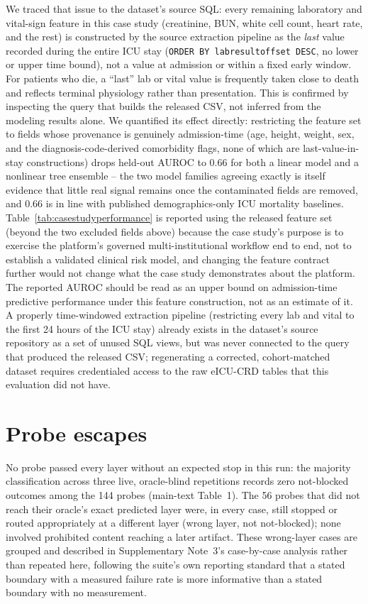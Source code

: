 We traced that issue to the dataset's source SQL: every remaining laboratory and
vital-sign feature in this case study (creatinine, BUN, white cell count, heart
rate, and the rest) is constructed by the source extraction pipeline as the
\emph{last} value recorded during the entire ICU stay (\texttt{ORDER BY
labresultoffset DESC}, no lower or upper time bound), not a value at admission or
within a fixed early window. For patients who die, a ``last'' lab or vital value is
frequently taken close to death and reflects terminal physiology rather than
presentation. This is confirmed by inspecting the query that builds the released
CSV, not inferred from the modeling results alone. We quantified its effect
directly: restricting the feature set to fields whose provenance is genuinely
admission-time (age, height, weight, sex, and the diagnosis-code-derived
comorbidity flags, none of which are last-value-in-stay constructions) drops
held-out AUROC to 0.66 for both a linear model and a nonlinear tree ensemble --
the two model families agreeing exactly is itself evidence that little real signal
remains once the contaminated fields are removed, and 0.66 is in line with
published demographics-only ICU mortality baselines. Table~\ref{tab:casestudyperformance}
is reported using the released feature set (beyond the two excluded fields above)
because the case study's purpose is to exercise the platform's governed
multi-institutional workflow end to end, not to establish a validated clinical
risk model, and changing the feature contract further would not change what the
case study demonstrates about the platform. The reported AUROC should be read as
an upper bound on admission-time predictive performance under this feature
construction, not as an estimate of it. A properly time-windowed extraction
pipeline (restricting every lab and vital to the first 24 hours of the ICU stay)
already exists in the dataset's source repository as a set of unused SQL views,
but was never connected to the query that produced the released CSV; regenerating
a corrected, cohort-matched dataset requires credentialed access to the raw
eICU-CRD tables that this evaluation did not have.

\section{Probe escapes}
\label{app:escapes}

No probe passed every layer without an expected stop in this run: the majority
classification across three live, oracle-blind repetitions records zero not-blocked
outcomes among the 144 probes (main-text Table~1). The 56 probes that did not reach
their oracle's exact predicted layer were, in every case, still stopped or routed
appropriately at a different layer (wrong layer, not not-blocked); none involved
prohibited content reaching a later artifact. These wrong-layer cases are grouped and
described in Supplementary Note~3's case-by-case analysis rather than repeated here,
following the suite's own reporting standard that a stated boundary with a measured
failure rate is more informative than a stated boundary with no measurement.

